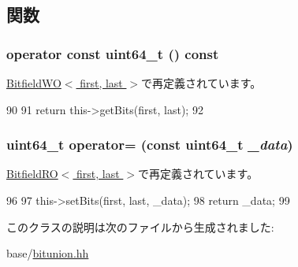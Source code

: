 \subsection{関数}
\hypertarget{classBitfieldBackend_1_1RegularBitfieldTypes_1_1Bitfield_a86f0216f6eb57ddf27a4f375c1d56d62}{
\subsubsection[{operator const uint64\_\-t}]{\setlength{\rightskip}{0pt plus 5cm}operator const uint64\_\-t () const}}
\label{classBitfieldBackend_1_1RegularBitfieldTypes_1_1Bitfield_a86f0216f6eb57ddf27a4f375c1d56d62}


\hyperlink{classBitfieldBackend_1_1RegularBitfieldTypes_1_1BitfieldWO_a86f0216f6eb57ddf27a4f375c1d56d62}{BitfieldWO$<$ first, last $>$}で再定義されています。


\begin{DoxyCode}
90             {
91                 return this->getBits(first, last);
92             }
\end{DoxyCode}
\hypertarget{classBitfieldBackend_1_1RegularBitfieldTypes_1_1Bitfield_a89ce74f3480b6d588fa6e042d8753675}{
\subsubsection[{operator=}]{\setlength{\rightskip}{0pt plus 5cm}uint64\_\-t operator= (const uint64\_\-t {\em \_\-data})}}
\label{classBitfieldBackend_1_1RegularBitfieldTypes_1_1Bitfield_a89ce74f3480b6d588fa6e042d8753675}


\hyperlink{classBitfieldBackend_1_1RegularBitfieldTypes_1_1BitfieldRO_a89ce74f3480b6d588fa6e042d8753675}{BitfieldRO$<$ first, last $>$}で再定義されています。


\begin{DoxyCode}
96             {
97                 this->setBits(first, last, _data);
98                 return _data;
99             }
\end{DoxyCode}


このクラスの説明は次のファイルから生成されました:\begin{DoxyCompactItemize}
\item 
base/\hyperlink{bitunion_8hh}{bitunion.hh}\end{DoxyCompactItemize}
